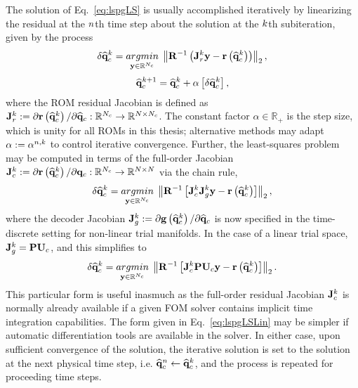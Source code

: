 The solution of Eq.~\ref{eq:lspgLS} is usually accomplished iteratively by linearizing the residual at the $n$th time step about the solution at the $k$th subiteration, given by the process
%
\begin{equation}\label{eq:lspgLSLin}
    \delta \consVecCoef^{\newtonIdx} = \argmin{\dummyVec \inROne{\numConsModes}} \left\Vert \resScaleInv \left(\jacobRes^{\newtonIdx} \dummyVec - \resFunc{\consVecCoef^{\newtonIdx}}\right) \right\Vert_2,
\end{equation}
\begin{equation}
    \mathbf{\widehat{q}}_{c}^{k + 1} = \mathbf{\widehat{q}}_{c}^{k} + \alpha \left[ \delta \mathbf{\widehat{q}}_{c}^{k} \right],
\end{equation}
%
where the ROM residual Jacobian is defined as $\mathbf{J}_{r}^{k} := \partial \mathbf{r}\left(\mathbf{\widehat{q}}_{c}^{k}\right) / \partial \mathbf{\widehat{q}}_{c}: \mathbb{R}^{N_c} \rightarrow \mathbb{R}^{N \times N_c}$. The constant factor $\alpha \in \mathbb{R}_+$ is the step size, which is unity for all ROMs in this thesis; alternative methods may adapt $\alpha := \alpha^{n,k}$ to control iterative convergence. Further, the least-squares problem may be computed in terms of the full-order Jacobian $\mathbf{J}_{c}^{k} := \partial \mathbf{r}\left(\mathbf{\widehat{q}}_{c}^{k}\right) / \partial \mathbf{q}_{c}: \mathbb{R}^{N_c} \rightarrow \mathbb{R}^{N \times N}$ via the chain rule,
%
\begin{equation}
    \delta \consVecCoef^{\newtonIdx} = \argmin{\dummyVec \inROne{\numConsModes}} \left\Vert \resScaleInv \left[\jacobCons^{\newtonIdx} \jacobDecode^{\newtonIdx} \dummyVec - \resFunc{\consVecCoef^{\newtonIdx}}\right] \right\Vert_2,
\end{equation}
%
where the decoder Jacobian $\mathbf{J}_{g}^{k} := \partial \mathbf{g} \left(\mathbf{\widehat{q}}_{c}^{k}\right) / \partial \mathbf{\widehat{q}}_{c}$ is now specified in the time-discrete setting for non-linear trial manifolds. In the case of a linear trial space, $\jacobDecode^{\newtonIdx} = \consScale \consTrial$, and this simplifies to
%
\begin{equation}
    \delta \consVecCoef^{\newtonIdx} = \argmin{\dummyVec \inROne{\numConsModes}} \left\Vert \resScaleInv \left[\jacobCons^{\newtonIdx} \consScale \consTrial \dummyVec - \resFunc{\consVecCoef^{\newtonIdx}}\right] \right\Vert_2.
\end{equation}
%
This particular form is useful inasmuch as the full-order residual Jacobian $\mathbf{J}_{c}^{k}$ is normally already available if a given FOM solver contains implicit time integration capabilities. The form given in Eq.~\ref{eq:lspgLSLin} may be simpler if automatic differentiation tools are available in the solver. In either case, upon sufficient convergence of the solution, the iterative solution is set to the solution at the next physical time step, i.e. $\mathbf{\widehat{q}}_{c}^{n} \leftarrow \mathbf{\widehat{q}}_{c}^{k}$, and the process is repeated for proceeding time steps.

